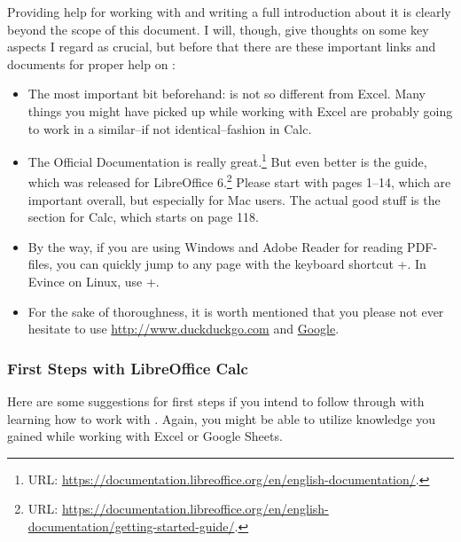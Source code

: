 Providing help for working with \loc and writing a full introduction about it is clearly beyond the scope of this document.
I will, though, give thoughts on some key aspects I regard as crucial, but before that there are these important links and documents for proper help on \loc:
\begin{itemize}
	\item The most important bit beforehand: \loc is not so different from Excel.
	Many things you might have picked up while working with Excel are probably going to work in a similar--if not identical--fashion in Calc.
	\item The Official Documentation is really great.\footnote{URL: \href{https://documentation.libreoffice.org/en/english-documentation/}{https://documentation.libreoffice.org/en/english-documentation/}.}
	But even better is the  guide, which was released for LibreOffice 6.\footnote{URL: \href{https://documentation.libreoffice.org/en/english-documentation/getting-started-guide/}{https://documentation.libreoffice.org/en/english-documentation/getting-started-guide/}.}
	Please start with pages 1--14, which are important overall, but especially for Mac users.
	The actual good stuff is the section for Calc, which starts on page 118.
	\item By the way, if you are using Windows and Adobe Reader for reading PDF-files, you can quickly jump to any page with the keyboard shortcut +.
	In Evince on Linux, use +.
	\item For the sake of thoroughness, it is worth mentioned that you please not ever hesitate to use \href{http://www.duckduckgo.com}{http://www.duckduckgo.com} and  \href{https://www.google.com}{Google}.
\end{itemize}

\subsubsection{First Steps with LibreOffice Calc}
\label{subsubsec:first-steps-with-libreoffice-calc}

Here are some suggestions for first steps if you intend to follow through with learning how to work with \loc.
Again, you might be able to utilize knowledge you gained while working with Excel or Google Sheets.

